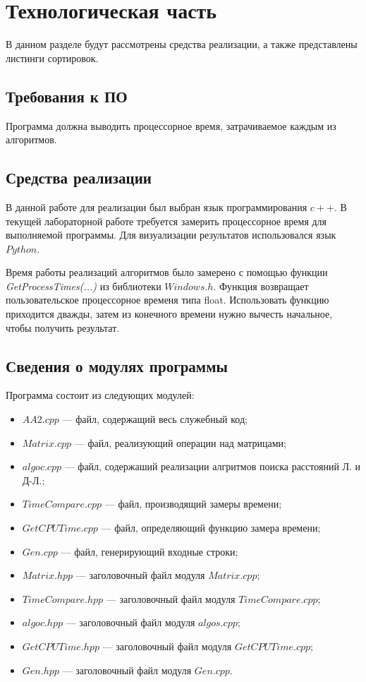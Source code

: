 \chapter{Технологическая часть}
В данном разделе будут рассмотрены средства реализации, а также представлены листинги сортировок.
\section{Требования к ПО}

Программа должна выводить процессорное время, затрачиваемое каждым из алгоритмов.

\section{Средства реализации}
В данной работе для реализации был выбран язык программирования $c++$. В текущей лабораторной работе требуется замерить процессорное время для выполняемой программы. Для визуализации результатов использовался язык $Python$.

Время работы реализаций алгоритмов было замерено с помощью функции \textit{GetProcessTimes(...)} \cite{time} из библиотеки $Windows.h$. Функция возвращает пользовательское процессорное временя типа float.
Использовать функцию приходится дважды, затем из конечного времени нужно вычесть начальное, чтобы получить результат.


\section{Сведения о модулях программы}
Программа состоит из следующих модулей:
\begin{itemize}
	\item $AA2.cpp$ --- файл, содержащий весь служебный код;
	\item $Matrix.cpp$ --- файл, реализующий операции над матрицами;
	\item $algoc.cpp$ --- файл, содержаший реализации алгритмов поиска расстояний Л. и Д-Л.;
	\item $TimeCompare.cpp$ --- файл, производящий замеры времени;
	\item $GetCPUTime.cpp$ --- файл, определяющий функцию замера времени;
	\item $Gen.cpp$ --- файл, генерирующий входные строки;
	\item $Matrix.hpp$ --- заголовочный файл модуля $Matrix.cpp$;
	\item $TimeCompare.hpp$ --- заголовочный файл модуля $TimeCompare.cpp$;
	\item $algoc.hpp$ --- заголовочный файл модуля $algos.cpp$;
	\item $GetCPUTime.hpp$ --- заголовочный файл модуля $GetCPUTime.cpp$;
	\item $Gen.hpp$ --- заголовочный файл модуля $Gen.cpp$.
\end{itemize}

